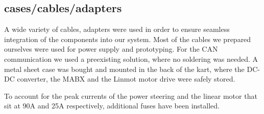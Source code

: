 \subsection{cases/cables/adapters}
A wide variety of cables, adapters were used in order to ensure seamless integration of the components into our system.
Most of the cables we prepared ourselves were used for power supply and prototyping.
For the CAN communication we used a preexisting solution, where no soldering was needed.
A metal sheet case was bought and mounted in the back of the kart, where the DC-DC converter, the MABX and the Linmot motor drive were safely stored.

To account for the peak currents of the power steering and the linear motor that sit at 90A and 25A respectively, additional fuses have been installed.